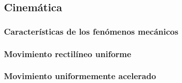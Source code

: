 \subsection{Cinemática}
\subsubsection{Características de los fenómenos mecánicos}
\subsubsection{Movimiento rectilíneo uniforme}
\subsubsection{Movimiento uniformemente acelerado}
